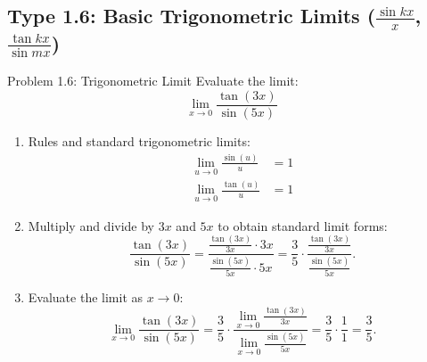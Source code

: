 \documentclass[11pt,a4paper]{article}
\begin{document}
\subsection{Type 1.6: Basic Trigonometric Limits ($\frac{\sin kx}{x}$, $\frac{\tan kx}{\sin mx}$)}
\begin{problembox}{Problem 1.6: Trigonometric Limit}
Evaluate the limit:
\[
\lim_{x \to 0} \frac{\tan(3x)}{\sin(5x)}
\]
\end{problembox}
\begin{solutionbox}
\begin{enumerate}
	\item [Step 1.] Rules and standard trigonometric limits:
	\begin{align*}
		\lim_{u \to 0} \frac{\sin(u)}{u} &= 1 \\
		\lim_{u \to 0} \frac{\tan(u)}{u} &= 1
	\end{align*}
	
	\item [Step 2.] Multiply and divide by $3x$ and $5x$ to obtain standard limit forms:
	\begin{equation*}
		\frac{\tan(3x)}{\sin(5x)} = \frac{\frac{\tan(3x)}{3x} \cdot 3x}{\frac{\sin(5x)}{5x} \cdot 5x} = \frac{3}{5} \cdot \frac{\frac{\tan(3x)}{3x}}{\frac{\sin(5x)}{5x}}.
	\end{equation*}

	\item [Step 3.] Evaluate the limit as $x \to 0$:
	\begin{equation*}
		\lim_{x \to 0} \frac{\tan(3x)}{\sin(5x)} = \frac{3}{5} \cdot \frac{\lim_{x \to 0}\frac{\tan(3x)}{3x}}{\lim_{x \to 0}\frac{\sin(5x)}{5x}} = \frac{3}{5} \cdot \frac{1}{1} = \frac{3}{5}.
	\end{equation*}
\end{enumerate}
\end{solutionbox}
\end{document}
